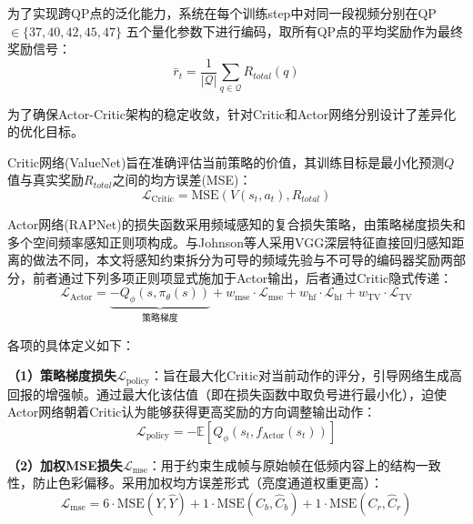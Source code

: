 为了实现跨QP点的泛化能力，系统在每个训练step中对同一段视频分别在QP $\in \{37, 40, 42, 45, 47\}$ 五个量化参数下进行编码，取所有QP点的平均奖励作为最终奖励信号：
\begin{equation}
  \bar{r}_t = \frac{1}{|\mathcal{Q}|} \sum_{q \in \mathcal{Q}} R_{total}(q)
  \label{eq:reward-avg}
\end{equation}

为了确保Actor-Critic架构的稳定收敛，针对Critic和Actor网络分别设计了差异化的优化目标。

Critic网络(ValueNet)旨在准确评估当前策略的价值，其训练目标是最小化预测$Q$值与真实奖励$R_{total}$之间的均方误差(MSE)：
\begin{equation}
  \mathcal{L}_{\text{Critic}} = \text{MSE}(V(s_t, a_t), R_{total})
  \label{eq:critic-loss}
\end{equation}

Actor网络(RAPNet)的损失函数采用频域感知的复合损失策略，由策略梯度损失和多个空间频率感知正则项构成。与Johnson等人\cite{ref49-johnson2016perceptual}采用VGG\cite{ref50-simonyan2015vgg}深层特征直接回归感知距离的做法不同，本文将感知约束拆分为可导的频域先验与不可导的编码器奖励两部分，前者通过下列多项正则项显式施加于Actor输出，后者通过Critic隐式传递：
\begin{equation}
  \mathcal{L}_{\text{Actor}} = \underbrace{-Q_\phi(s, \pi_\theta(s))}_{\text{策略梯度}} + w_{\text{mse}} \cdot \mathcal{L}_{\text{mse}} + w_{\text{hf}} \cdot \mathcal{L}_{\text{hf}} + w_{\text{TV}} \cdot \mathcal{L}_{\text{TV}}
  \label{eq:actor-loss-full}
\end{equation}

各项的具体定义如下：

\textbf{（1）策略梯度损失}$\mathcal{L}_{\text{policy}}$：旨在最大化Critic对当前动作的评分，引导网络生成高回报的增强帧。通过最大化该估值（即在损失函数中取负号进行最小化），迫使Actor网络朝着Critic认为能够获得更高奖励的方向调整输出动作：
\begin{equation}
  \mathcal{L}_{\text{policy}} = -\mathbb{E}[Q_\phi(s_t, f_{\text{Actor}}(s_t))]
  \label{eq:policy-loss}
\end{equation}

\textbf{（2）加权MSE损失}$\mathcal{L}_{\text{mse}}$：用于约束生成帧与原始帧在低频内容上的结构一致性，防止色彩偏移。采用加权均方误差形式（亮度通道权重更高）：
\begin{equation}
  \mathcal{L}_{\text{mse}} = 6 \cdot \text{MSE}(Y, \hat{Y}) + 1 \cdot \text{MSE}(C_b, \hat{C}_b) + 1 \cdot \text{MSE}(C_r, \hat{C}_r)
  \label{eq:mse-loss}
\end{equation}

